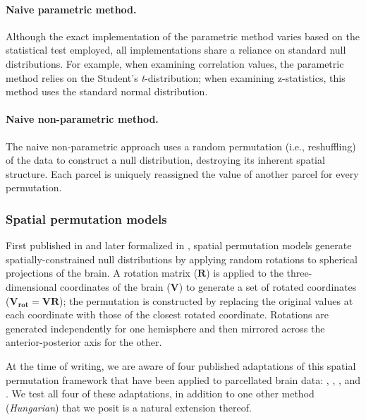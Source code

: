 \documentclass[12pt,aps,pra,reprint,showkeys]{revtex4-1}
\begin{document}
\paragraph*{Naive parametric method.}

Although the exact implementation of the parametric method varies based on the statistical test employed, all implementations share a reliance on standard null distributions.
For example, when examining correlation values, the parametric method relies on the Student's \emph{t}-distribution; when examining z-statistics, this method uses the standard normal distribution.

\paragraph*{Naive non-parametric method.}

The naive non-parametric approach uses a random permutation (i.e., reshuffling) of the data to construct a null distribution, destroying its inherent spatial structure.
Each parcel is uniquely reassigned the value of another parcel for every permutation.

\subsubsection*{Spatial permutation models}

First published in \citet{alexander2013convergence} and later formalized in \citet{alexanderbloch2018neuroimage}, spatial permutation models generate spatially-constrained null distributions by applying random rotations to spherical projections of the brain.
A rotation matrix ($\mathbf{R}$) is applied to the three-dimensional coordinates of the brain ($\mathbf{V}$) to generate a set of rotated coordinates ($\mathbf{V_{rot}} = \mathbf{V} \mathbf{R}$); the permutation is constructed by replacing the original values at each coordinate with those of the closest rotated coordinate.
Rotations are generated independently for one hemisphere and then mirrored across the anterior-posterior axis for the other.

At the time of writing, we are aware of four published adaptations of this spatial permutation framework that have been applied to parcellated brain data: \citet{vazquezrodriguez2019pnas}, \citet{vasa2018cercor}, \citet{baum2020pnas}, and \citet{cornblath2019arxiv}.
We test all four of these adaptations, in addition to one other method (\emph{Hungarian}) that we posit is a natural extension thereof.
\end{document}
